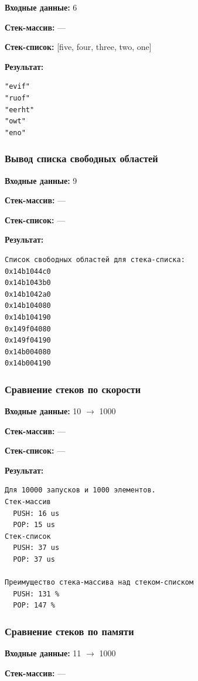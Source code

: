 \documentclass[a4paper,12pt]{extarticle}
\begin{document}
\textbf{Входные данные: }
6

\textbf{Стек-массив: }
---

\textbf{Стек-список: }
[five, four, three, two, one]

\textbf{Результат: }

\begin{verbatim}
"evif"
"ruof"
"eerht"
"owt"
"eno"
\end{verbatim}

\subsubsection{Вывод списка свободных областей}

\textbf{Входные данные: }
9

\textbf{Стек-массив: }
---

\textbf{Стек-список: }
---

\textbf{Результат: }

\begin{verbatim}
Список свободных областей для стека-списка:
0x14b1044c0
0x14b1043b0
0x14b1042a0
0x14b104080
0x14b104190
0x149f04080
0x149f04190
0x14b004080
0x14b004190
\end{verbatim}

\subsubsection{Сравнение стеков по скорости}

\textbf{Входные данные: }
10 $\rightarrow$ 1000

\textbf{Стек-массив: }
---

\textbf{Стек-список: }
---

\textbf{Результат: }

\begin{verbatim}
Для 10000 запусков и 1000 элементов.
Стек-массив
  PUSH: 16 us
  POP: 15 us
Стек-список
  PUSH: 37 us
  POP: 37 us

Преимущество стека-массива над стеком-списком
  PUSH: 131 %
  POP: 147 %
\end{verbatim}

\subsubsection{Сравнение стеков по памяти}

\textbf{Входные данные: }
11 $\rightarrow$ 1000

\textbf{Стек-массив: }
---
\end{document}
